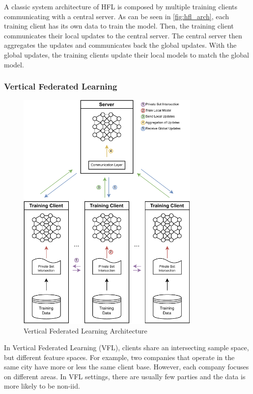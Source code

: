 A classic system architecture of HFL is composed by multiple training clients communicating with a central server. As can be seen in \autoref{fig:hfl_arch}, each training client has its own data to train the model. Then, the training client communicates their local updates to the central server. The central server then aggregates the updates and communicates back the global updates. With the global updates, the training clients update their local models to match the global model.

\subsubsection{Vertical Federated Learning}

\begin{figure}[!ht]
    \centering
    \centering
    \includegraphics[width=0.8\textwidth]{graphics/vfl-architecture.pdf}
    \caption{Vertical Federated Learning Architecture}
    \label{fig:vfl_arch}
\end{figure}

In Vertical Federated Learning (VFL), clients share an intersecting sample space, but different feature spaces. For example, two companies that operate in the same city have more or less the same client base. However, each company focuses on different areas. In VFL settings, there are usually few parties and the data is more likely to be non-iid.

